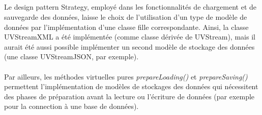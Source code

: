 \documentclass[a4paper,10pt,french]{report}
\begin{document}
			\paragraph{}
		\subsubsection{}
			\paragraph{}
			\paragraph{}
			\paragraph{}	
	\subsection{}\label{subsec:IIB}
	
	Le design pattern Strategy, employé dans les fonctionnalités de chargement et de sauvegarde des données, laisse le choix de l'utilisation d'un type de modèle de données par l'implémentation d'une classe fille correspondante.
	Ainsi, la classe UVStreamXML a été implémentée (comme classe dérivée de UVStream), mais il aurait été aussi possible implémenter un second modèle de stockage des données (une classe UVStreamJSON, par exemple).\\\\
	Par ailleurs, les méthodes virtuelles pures \emph{prepareLoading()} et \emph{prepareSaving()} permettent l'implémentation de modèles de stockages des données qui nécessitent des phases de préparation avant la lecture ou l'écriture de données (par exemple pour la connection à une base de données).
	
		\subsubsection{}
			\paragraph{}
			\paragraph{}
			\paragraph{}
\end{document}
